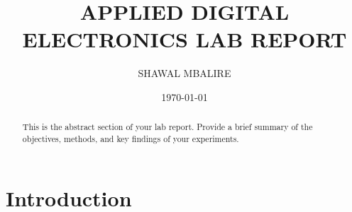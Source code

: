 \documentclass{article}
\title{APPLIED DIGITAL ELECTRONICS LAB REPORT}
\author{SHAWAL MBALIRE}
\date{\today}
\begin{document}
\maketitle
\newpage

\begin{abstract}
    This is the abstract section of your lab report. Provide a brief summary of the objectives, methods, and key findings of your experiments.
\end{abstract}

\section{Introduction}



\end{document}
